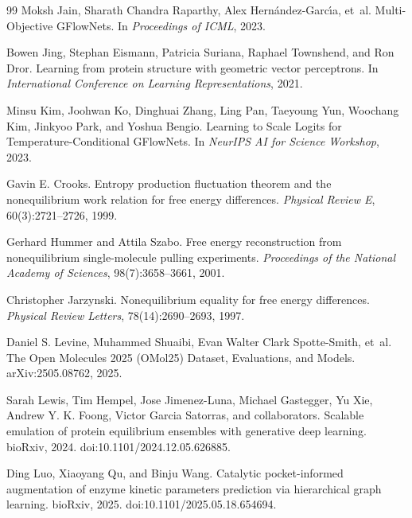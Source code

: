 \documentclass[11pt]{article}
\begin{document}
\begin{thebibliography}{99}
		Moksh Jain, Sharath Chandra Raparthy, Alex Hern{\'a}ndez-Garc{\'\i}a, et~al.
		\newblock Multi-Objective GFlowNets.
		\newblock In \emph{Proceedings of ICML}, 2023.
		
		Bowen Jing, Stephan Eismann, Patricia Suriana, Raphael Townshend, and Ron Dror.
		\newblock Learning from protein structure with geometric vector perceptrons.
		\newblock In \emph{International Conference on Learning Representations}, 2021.
		
		Minsu Kim, Joohwan Ko, Dinghuai Zhang, Ling Pan, Taeyoung Yun, Woochang Kim, Jinkyoo Park, and Yoshua Bengio.
		\newblock Learning to Scale Logits for Temperature-Conditional GFlowNets.
		\newblock In \emph{NeurIPS AI for Science Workshop}, 2023.
		
		Gavin E. Crooks.
		\newblock Entropy production fluctuation theorem and the nonequilibrium work relation for free energy differences.
		\newblock \emph{Physical Review E}, 60(3):2721--2726, 1999.
		
		Gerhard Hummer and Attila Szabo.
		\newblock Free energy reconstruction from nonequilibrium single-molecule pulling experiments.
		\newblock \emph{Proceedings of the National Academy of Sciences}, 98(7):3658--3661, 2001.
		
		Christopher Jarzynski.
		\newblock Nonequilibrium equality for free energy differences.
		\newblock \emph{Physical Review Letters}, 78(14):2690--2693, 1997.
		
		Daniel S. Levine, Muhammed Shuaibi, Evan Walter Clark Spotte-Smith, et~al.
		\newblock The Open Molecules 2025 (OMol25) Dataset, Evaluations, and Models.
		\newblock arXiv:2505.08762, 2025.
		
		Sarah Lewis, Tim Hempel, Jose Jimenez-Luna, Michael Gastegger, Yu Xie, Andrew Y. K. Foong, Victor Garcia Satorras, and collaborators.
		\newblock Scalable emulation of protein equilibrium ensembles with generative deep learning.
		\newblock bioRxiv, 2024. doi:10.1101/2024.12.05.626885.
		
		Ding Luo, Xiaoyang Qu, and Binju Wang.
		\newblock Catalytic pocket-informed augmentation of enzyme kinetic parameters prediction via hierarchical graph learning.
		\newblock bioRxiv, 2025. doi:10.1101/2025.05.18.654694.
		

\end{thebibliography}
\end{document}
